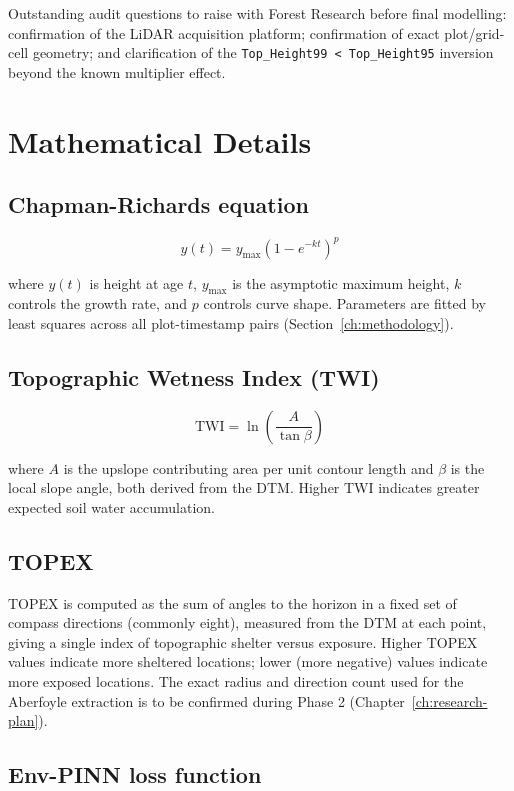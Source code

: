 Outstanding audit questions to raise with Forest Research before final modelling: confirmation of the LiDAR acquisition platform; confirmation of exact plot/grid-cell geometry; and clarification of the \texttt{Top\_Height99 < Top\_Height95} inversion beyond the known multiplier effect.

\chapter{Mathematical Details}
\label{app:math-details}

\section{Chapman-Richards equation}

\[
y(t) = y_{\max} \left(1 - e^{-kt}\right)^{p}
\]

where $y(t)$ is height at age $t$, $y_{\max}$ is the asymptotic maximum height, $k$ controls the growth rate, and $p$ controls curve shape. Parameters are fitted by least squares across all plot-timestamp pairs (Section~\ref{ch:methodology}).

\section{Topographic Wetness Index (TWI)}

\[
\text{TWI} = \ln\left(\frac{A}{\tan \beta}\right)
\]

where $A$ is the upslope contributing area per unit contour length and $\beta$ is the local slope angle, both derived from the DTM. Higher TWI indicates greater expected soil water accumulation.

\section{TOPEX}

TOPEX is computed as the sum of angles to the horizon in a fixed set of compass directions (commonly eight), measured from the DTM at each point, giving a single index of topographic shelter versus exposure. Higher TOPEX values indicate more sheltered locations; lower (more negative) values indicate more exposed locations. The exact radius and direction count used for the Aberfoyle extraction is to be confirmed during Phase 2 (Chapter~\ref{ch:research-plan}).

\section{Env-PINN loss function}

